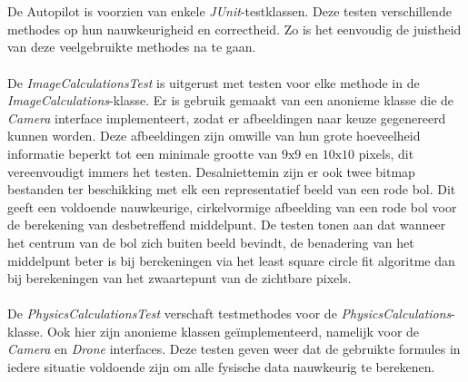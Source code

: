 \\
\\
De Autopilot is voorzien van enkele \textit{JUnit}-testklassen. Deze testen verschillende methodes op hun nauwkeurigheid en correctheid. Zo is het eenvoudig de juistheid van deze veelgebruikte methodes na te gaan.
\\
\\
De \textit{ImageCalculationsTest} is uitgerust met testen voor elke methode in de \textit{ImageCalculations}-klasse. Er is gebruik gemaakt van een anonieme klasse die de \textit{Camera} interface implementeert, zodat er afbeeldingen naar keuze gegenereerd kunnen worden. Deze afbeeldingen zijn omwille van hun grote hoeveelheid informatie beperkt tot een minimale grootte van \(9\text{x}9\) en \(10\text{x}10\) pixels, dit vereenvoudigt immers het testen. Desalniettemin zijn er ook twee bitmap bestanden ter beschikking met elk een representatief beeld van een rode bol. Dit geeft een voldoende nauwkeurige, cirkelvormige afbeelding van een rode bol voor de berekening van desbetreffend middelpunt. De testen tonen aan dat wanneer het centrum van de bol zich buiten beeld bevindt, de benadering van het middelpunt beter is bij berekeningen via het least square circle fit algoritme dan bij berekeningen van het zwaartepunt van de zichtbare pixels.
\\
\\
De \textit{PhysicsCalculationsTest} verschaft testmethodes voor de \textit{PhysicsCalculations}-klasse. Ook hier zijn anonieme klassen ge\"implementeerd, namelijk voor de \textit{Camera} en \textit{Drone} interfaces. Deze testen geven weer dat de gebruikte formules in iedere situatie voldoende zijn om alle fysische data nauwkeurig te berekenen.
